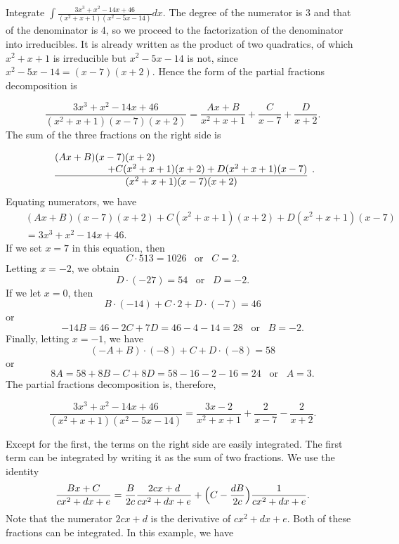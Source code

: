 \begin{example}
Integrate $\int \frac{3x^3 + x^2 -14x + 46}{(x^2 + x + 1)(x^2 - 5x - 14)} dx$. The degree of the numerator is 3 and that of the denominator is 4, so we proceed to the factorization of the denominator into irreducibles. It is already written as the product of two quadratics, of which $x^2 + x + 1$ is irreducible but $x^2 - 5x -14$ is not, since $x^2 - 5x - 14 = (x - 7)(x + 2)$. Hence the form of the partial fractions decomposition is

$$
\frac{3x^3 + x^2 -14x + 46}{(x^2 + x + 1)(x - 7)(x + 2)} 
= \frac{Ax + B}{x^2 + x + 1} + \frac{C}{x - 7} + \frac{D}{x + 2}.
$$
\noindent The sum of the three fractions on the right side is

$$
\begin{array}{l}
(Ax + B)(x - 7)(x + 2)\\
\underline{\hspace{.75in}+ C(x^2 + x + 1)(x + 2) + D(x^2 + x + 1)(x - 7)} \\ 
\hspace{1in}(x^2 + x + 1)(x - 7)(x + 2)
\end{array}.
$$
\noindent Equating numerators, we have 
\begin{eqnarray*}
&&(Ax + B)(x-7)(x+ 2) + C(x^2 + x + 1)(x + 2) + D(x^2 + x + 1)(x-7) \\
&& = 3x^3 + x^2 - 14x + 46.
\end{eqnarray*}
\noindent If we set $x = 7$ in this equation, then
$$
C \cdot 513= 1026 \;\;\;\mbox{or}\;\;\; C = 2.
$$
Letting $x = - 2$, we obtain
$$
D \cdot (- 27) = 54 \;\;\; \mbox{or} \;\;\; D = - 2.
$$
If we let $x = 0$, then
$$
B \cdot (- 14) + C \cdot 2 + D \cdot ( - 7) = 46
$$
\noindent or
$$
-14B = 46 - 2C + 7D = 46 - 4 - 14 = 28 \;\;\;\mbox{or} \;\;\; B = - 2.
$$
\noindent Finally, letting $x = - 1$, we have
$$
(-A + B) \cdot (-8) + C + D \cdot (-8) = 58 
$$
\noindent or
$$
8A = 58 + 8B - C + 8D = 58 - 16 - 2 - 16 = 24 \;\;\; \mbox{or} \;\;\; A = 3.
$$
\noindent The partial fractions decomposition is, therefore, 

\begin{equation}
\frac{3x^3 + x^2 - 14x + 46}{(x^2 + x + 1)(x^2 - 5x -14)} = \frac{3x - 2}{x^2 + x + 1} + \frac{2}{x - 7} - \frac{2}{x + 2}.
\label{eq7.4.4}
\end{equation}

\noindent Except for the first, the terms on the right side are easily integrated. The first term can be integrated by writing it as the sum of two fractions. We use the identity
$$
\frac{Bx + C}{cx^2+ dx+e} = \frac{B}{2c} \frac{2cx + d}{cx^2+ dx + e} 
+ \Bigl(C - \frac{dB}{2c} \Bigr) \frac{1}{cx^2+ dx + e}.
$$
\noindent Note that the numerator $2cx + d$ is the derivative of $cx^2 + dx + e$. Both of these fractions can be integrated. In this example, we have


\end{example}
